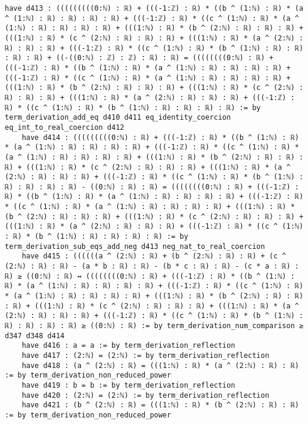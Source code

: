 \documentclass{article}
\begin{document}
\begin{tcolorbox}[colback=white!10, width=\linewidth]
\begin{lstlisting}[language=Lean4]
    have d413 : (((((((((0:ℕ) : ℝ) + (((-1:ℤ) : ℝ) * ((b ^ (1:ℕ) : ℝ) * (a ^ (1:ℕ) : ℝ) : ℝ) : ℝ) : ℝ) + (((-1:ℤ) : ℝ) * ((c ^ (1:ℕ) : ℝ) * (a ^ (1:ℕ) : ℝ) : ℝ) : ℝ) : ℝ) + (((1:ℕ) : ℝ) * (b ^ (2:ℕ) : ℝ) : ℝ) : ℝ) + (((1:ℕ) : ℝ) * (c ^ (2:ℕ) : ℝ) : ℝ) : ℝ) + (((1:ℕ) : ℝ) * (a ^ (2:ℕ) : ℝ) : ℝ) : ℝ) + (((-1:ℤ) : ℝ) * ((c ^ (1:ℕ) : ℝ) * (b ^ (1:ℕ) : ℝ) : ℝ) : ℝ) : ℝ) + ((-((0:ℕ) : ℤ) : ℤ) : ℝ) : ℝ) = ((((((((0:ℕ) : ℝ) + (((-1:ℤ) : ℝ) * ((b ^ (1:ℕ) : ℝ) * (a ^ (1:ℕ) : ℝ) : ℝ) : ℝ) : ℝ) + (((-1:ℤ) : ℝ) * ((c ^ (1:ℕ) : ℝ) * (a ^ (1:ℕ) : ℝ) : ℝ) : ℝ) : ℝ) + (((1:ℕ) : ℝ) * (b ^ (2:ℕ) : ℝ) : ℝ) : ℝ) + (((1:ℕ) : ℝ) * (c ^ (2:ℕ) : ℝ) : ℝ) : ℝ) + (((1:ℕ) : ℝ) * (a ^ (2:ℕ) : ℝ) : ℝ) : ℝ) + (((-1:ℤ) : ℝ) * ((c ^ (1:ℕ) : ℝ) * (b ^ (1:ℕ) : ℝ) : ℝ) : ℝ) : ℝ) := by term_derivation_add_eq d410 d411 eq_identity_coercion eq_int_to_real_coercion d412
    have d414 : (((((((((0:ℕ) : ℝ) + (((-1:ℤ) : ℝ) * ((b ^ (1:ℕ) : ℝ) * (a ^ (1:ℕ) : ℝ) : ℝ) : ℝ) : ℝ) + (((-1:ℤ) : ℝ) * ((c ^ (1:ℕ) : ℝ) * (a ^ (1:ℕ) : ℝ) : ℝ) : ℝ) : ℝ) + (((1:ℕ) : ℝ) * (b ^ (2:ℕ) : ℝ) : ℝ) : ℝ) + (((1:ℕ) : ℝ) * (c ^ (2:ℕ) : ℝ) : ℝ) : ℝ) + (((1:ℕ) : ℝ) * (a ^ (2:ℕ) : ℝ) : ℝ) : ℝ) + (((-1:ℤ) : ℝ) * ((c ^ (1:ℕ) : ℝ) * (b ^ (1:ℕ) : ℝ) : ℝ) : ℝ) : ℝ) - ((0:ℕ) : ℝ) : ℝ) = ((((((((0:ℕ) : ℝ) + (((-1:ℤ) : ℝ) * ((b ^ (1:ℕ) : ℝ) * (a ^ (1:ℕ) : ℝ) : ℝ) : ℝ) : ℝ) + (((-1:ℤ) : ℝ) * ((c ^ (1:ℕ) : ℝ) * (a ^ (1:ℕ) : ℝ) : ℝ) : ℝ) : ℝ) + (((1:ℕ) : ℝ) * (b ^ (2:ℕ) : ℝ) : ℝ) : ℝ) + (((1:ℕ) : ℝ) * (c ^ (2:ℕ) : ℝ) : ℝ) : ℝ) + (((1:ℕ) : ℝ) * (a ^ (2:ℕ) : ℝ) : ℝ) : ℝ) + (((-1:ℤ) : ℝ) * ((c ^ (1:ℕ) : ℝ) * (b ^ (1:ℕ) : ℝ) : ℝ) : ℝ) : ℝ) := by term_derivation_sub_eqs_add_neg d413 neg_nat_to_real_coercion
    have d415 : ((((((a ^ (2:ℕ) : ℝ) + (b ^ (2:ℕ) : ℝ) : ℝ) + (c ^ (2:ℕ) : ℝ) : ℝ) - (a * b : ℝ) : ℝ) - (b * c : ℝ) : ℝ) - (c * a : ℝ) : ℝ) ≥ ((0:ℕ) : ℝ) ↔ ((((((((0:ℕ) : ℝ) + (((-1:ℤ) : ℝ) * ((b ^ (1:ℕ) : ℝ) * (a ^ (1:ℕ) : ℝ) : ℝ) : ℝ) : ℝ) + (((-1:ℤ) : ℝ) * ((c ^ (1:ℕ) : ℝ) * (a ^ (1:ℕ) : ℝ) : ℝ) : ℝ) : ℝ) + (((1:ℕ) : ℝ) * (b ^ (2:ℕ) : ℝ) : ℝ) : ℝ) + (((1:ℕ) : ℝ) * (c ^ (2:ℕ) : ℝ) : ℝ) : ℝ) + (((1:ℕ) : ℝ) * (a ^ (2:ℕ) : ℝ) : ℝ) : ℝ) + (((-1:ℤ) : ℝ) * ((c ^ (1:ℕ) : ℝ) * (b ^ (1:ℕ) : ℝ) : ℝ) : ℝ) : ℝ) ≥ ((0:ℕ) : ℝ) := by term_derivation_num_comparison ≥ d347 d348 d414
    have d416 : a = a := by term_derivation_reflection
    have d417 : (2:ℕ) = (2:ℕ) := by term_derivation_reflection
    have d418 : (a ^ (2:ℕ) : ℝ) = (((1:ℕ) : ℝ) * (a ^ (2:ℕ) : ℝ) : ℝ) := by term_derivation_non_reduced_power
    have d419 : b = b := by term_derivation_reflection
    have d420 : (2:ℕ) = (2:ℕ) := by term_derivation_reflection
    have d421 : (b ^ (2:ℕ) : ℝ) = (((1:ℕ) : ℝ) * (b ^ (2:ℕ) : ℝ) : ℝ) := by term_derivation_non_reduced_power

\end{lstlisting}
\end{tcolorbox}
\end{document}
